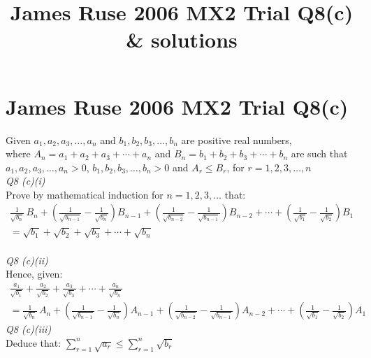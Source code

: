 \documentclass[11pt,a4paper]{article}
\title{James Ruse 2006 MX2 Trial Q8(c) & solutions}
\author{}
\date{}
\begin{document}
\section*{James Ruse 2006 MX2 Trial Q8(c)}
Given $a_1, a_2, a_3, \dots, a_n$ and $b_1, b_2, b_3, \dots, b_n$ are positive real numbers,\\
where $A_n = a_1 + a_2 + a_3 + \cdots + a_n$ and $B_n = b_1 + b_2 + b_3 + \cdots + b_n$ are such that\\
$a_1, a_2, a_3, \dots, a_n > 0$, $b_1, b_2, b_3, \dots, b_n > 0$ and $A_r \leq B_r$, for $r=1,2,3,\dots, n$\\[1em]
\textit{Q8 (c)(i)}\\[1em]
Prove by mathematical induction for $n=1,2,3, \dots$ that:
\begin{align*}
\frac{1}{\sqrt{b_n}}\,B_n+\left(\frac{1}{\sqrt{b_{n-1}}}-\frac{1}{\sqrt{b_n}}\right)B_{n-1}+\left(\frac{1}{\sqrt{b_{n-2}}}-\frac{1}{\sqrt{b_{n-1}}}\right)B_{n-2} + \cdots + \left(\frac{1}{\sqrt{b_1}}-\frac{1}{\sqrt{b_2}}\right)B_{1}\\ = \sqrt{b_1} + \sqrt{b_2} + \sqrt{b_3} + \cdots + \sqrt{b_n} \end{align*}\\
\textit{Q8 (c)(ii)}\\[1em]
Hence, given:
\begin{align*}
\frac{a_1}{\sqrt{b_1}}+\frac{a_2}{\sqrt{b_2}}+\frac{a_3}{\sqrt{b_3}}+\cdots+\frac{a_n}{\sqrt{b_n}}\\
=\frac{1}{\sqrt{b_n}}\,A_n+\left(\frac{1}{\sqrt{b_{n-1}}}-\frac{1}{\sqrt{b_n}}\right)A_{n-1}+\left(\frac{1}{\sqrt{b_{n-2}}}-\frac{1}{\sqrt{b_{n-1}}}\right)A_{n-2}
+ \cdots + \left(\frac{1}{\sqrt{b_{1}}}-\frac{1}{\sqrt{b_2}}\right)A_{1} \end{align*}
\textit{Q8 (c)(iii)}\\[1em]
Deduce that: $\displaystyle\sum_{r=1}^{n}{\sqrt{a_r}} \leq \displaystyle\sum_{r=1}^{n}{\sqrt{b_r}}$
\end{document}
